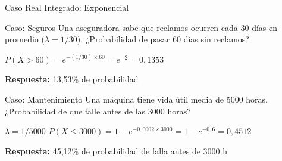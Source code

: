 \documentclass[10pt]{beamer}
\begin{document}
\begin{frame}{Caso Real Integrado: Exponencial}
\begin{exampleblock}{Caso: Seguros}
\footnotesize
Una aseguradora sabe que reclamos ocurren cada 30 días en promedio ($\lambda = 1/30$). ¿Probabilidad de pasar 60 días sin reclamos?

$P(X > 60) = e^{-(1/30) \times 60} = e^{-2} = 0{,}1353$

\textbf{Respuesta:} 13{,}53\% de probabilidad
\end{exampleblock}

\vspace{0.3cm}
\begin{exampleblock}{Caso: Mantenimiento}
\footnotesize
Una máquina tiene vida útil media de 5000 horas. ¿Probabilidad de que falle antes de las 3000 horas?

$\lambda = 1/5000$ \quad $P(X \leq 3000) = 1 - e^{-0{,}0002 \times 3000} = 1 - e^{-0{,}6} = 0{,}4512$

\textbf{Respuesta:} 45{,}12\% de probabilidad de falla antes de 3000 h
\end{exampleblock}
\end{frame}
\end{document}
